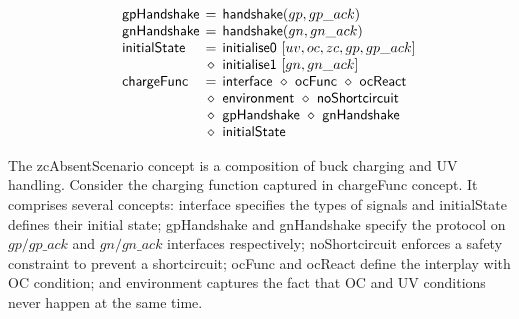 \documentclass[british, journal]{IEEEtran}
\begin{document}
\[\begin{array}{lcl}
~~~~\mathsf{gpHandshake}&\hspace{-2mm}=&\hspace{-2mm}\mathsf{handshake}(gp,gp\_ack)\\

~~~~\mathsf{gnHandshake}&\hspace{-2mm}=&\hspace{-2mm}\mathsf{handshake}(gn,gn\_ack)\\

~~~~\mathsf{initialState}&\hspace{-2mm}=&\hspace{-2mm}\mathsf{initialise0}~[uv,oc,zc,gp,gp\_ack]\\
~&\hspace{-2mm}\diamond&\hspace{-2mm}\mathsf{initialise1}~[gn,gn\_ack]\\

~~~~\mathsf{chargeFunc}&\hspace{-2mm}=&\hspace{-2mm}\mathsf{interface}~\diamond~\mathsf{ocFunc}~\diamond~\mathsf{ocReact}\\
~&\hspace{-2mm}\diamond&\hspace{-2mm}\mathsf{environment}~\diamond~\mathsf{noShortcircuit}\\
~&\hspace{-2mm}\diamond&\hspace{-2mm}\mathsf{gpHandshake}~\diamond~\mathsf{gnHandshake}\\
~&\hspace{-2mm}\diamond&\hspace{-2mm}\mathsf{initialState}

\end{array}
\]

The \textsf{zcAbsentScenario} concept is a composition of buck charging and UV handling.
Consider the charging function captured in \textsf{chargeFunc} concept.
It comprises several concepts: \textsf{interface} specifies the types
of signals and \textsf{initialState} defines their initial state;
\textsf{gpHandshake} and \textsf{gnHandshake} specify the protocol on $gp/gp\_ack$
and $gn/gn\_ack$ interfaces respectively;
\textsf{noShortcircuit} enforces a safety constraint to prevent a shortcircuit;
\textsf{ocFunc} and \textsf{ocReact} define the interplay with OC condition;
and \textsf{environment} captures the fact that OC and UV conditions never happen at the same time.
\end{document}

